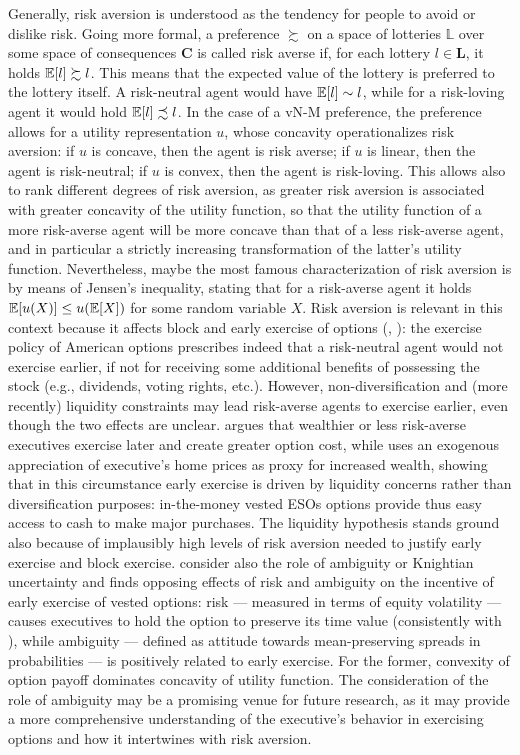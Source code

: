     Generally, risk aversion is understood as the tendency for people to avoid or dislike risk. Going more formal, a preference $\succsim$ on a space of lotteries $\mathbb{L}$ over some space of consequences $\mathbf{C}$ is called risk averse if, for each lottery $l \in \mathbf{L}$, it holds $\operatorname{\mathbb{E}}[l] \succsim l$. This means that the expected value of the lottery is preferred to the lottery itself. A risk-neutral agent would have $\operatorname{\mathbb{E}}[l] \sim l$, while for a risk-loving agent it would hold $\operatorname{\mathbb{E}}[l] \precsim l$. In the case of a vN-M preference, the preference allows for a utility representation $u$, whose concavity operationalizes risk aversion: if $u$ is concave, then the agent is risk averse; if $u$ is linear, then the agent is risk-neutral; if $u$ is convex, then the agent is risk-loving. This allows also to rank different degrees of risk aversion, as greater risk aversion is associated with greater concavity of the utility function, so that the utility function of a more risk-averse agent will be more concave than that of a less risk-averse agent, and in particular a strictly increasing transformation of the latter's utility function. Nevertheless, maybe the most famous characterization of risk aversion is by means of Jensen's inequality, stating that for a risk-averse agent it holds $\operatorname{\mathbb{E}}[u(X)] \leq u(\operatorname{\mathbb{E}}[X])$ for some random variable $X$.
    Risk aversion is relevant in this context because it affects block \citep{grasselli2009risk} and early exercise of options (\citet{izhakian2017risk}, \citet{murphy2019employees}): the exercise policy of American options prescribes indeed that a risk-neutral agent would not exercise earlier, if not for receiving some additional benefits of possessing the stock (e.g., dividends, voting rights, etc.). However, non-diversification and (more recently) liquidity constraints may lead risk-averse agents to exercise earlier, even though the two effects are unclear. \citet{carpenter2010optimal} argues that wealthier or less risk-averse executives exercise later and create greater option cost, while \citet{murphy2019employees} uses an exogenous appreciation of executive's home prices as proxy for increased wealth, showing that in this circumstance early exercise is driven by liquidity concerns rather than diversification purposes: in-the-money vested ESOs options provide thus easy access to cash to make major purchases. The liquidity hypothesis stands ground also because of implausibly high levels of risk aversion needed to justify early exercise and block exercise. 
    \citet{izhakian2017risk} consider also the role of ambiguity or Knightian uncertainty and finds opposing effects of risk and ambiguity on the incentive of early exercise of vested options: risk --- measured in terms of equity volatility --- causes executives to hold the option to preserve its time value (consistently with \citet{heron2017stock}), while ambiguity --- defined as attitude towards mean-preserving spreads in probabilities --- is positively related to early exercise. For the former, convexity of option payoff dominates concavity of utility function. The consideration of the role of ambiguity may be a promising venue for future research, as it may provide a more comprehensive understanding of the executive's behavior in exercising options and how it intertwines with risk aversion.
